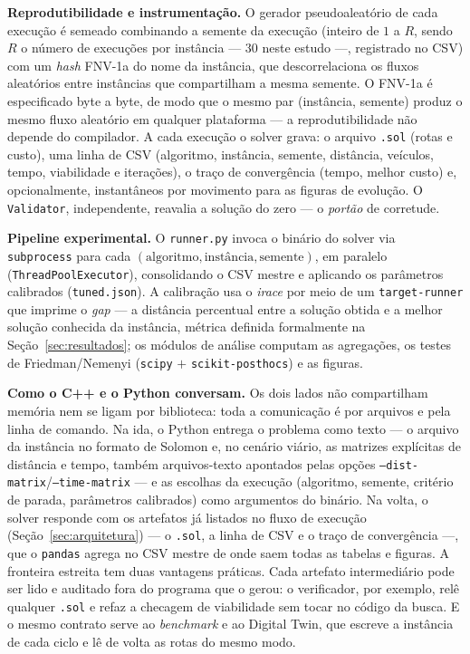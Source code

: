 \documentclass[12pt, a4paper]{article}
\begin{document}
\textbf{Reprodutibilidade e instrumentação.} O gerador pseudoaleatório de cada execução é semeado combinando a semente da execução (inteiro de $1$ a $R$, sendo $R$ o número de execuções por instância --- $30$ neste estudo ---, registrado no CSV) com um \emph{hash} FNV-1a do nome da instância, que descorrelaciona os fluxos aleatórios entre instâncias que compartilham a mesma semente. O FNV-1a é especificado byte a byte, de modo que o mesmo par (instância, semente) produz o mesmo fluxo aleatório em qualquer plataforma --- a reprodutibilidade não depende do compilador. A cada execução o solver grava: o arquivo \texttt{.sol} (rotas e custo), uma linha de CSV (algoritmo, instância, semente, distância, veículos, tempo, viabilidade e iterações), o traço de convergência (tempo, melhor custo) e, opcionalmente, instantâneos por movimento para as figuras de evolução. O \texttt{Validator}, independente, reavalia a solução do zero --- o \emph{portão} de corretude.

\textbf{Pipeline experimental.} O \texttt{runner.py} invoca o binário do solver via \texttt{subprocess} para cada $(\text{algoritmo},\text{instância},\text{semente})$, em paralelo (\texttt{ThreadPoolExecutor}), consolidando o CSV mestre e aplicando os parâmetros calibrados (\texttt{tuned.json}). A calibração usa o \textit{irace} por meio de um \texttt{target-runner} que imprime o \emph{gap} --- a distância percentual entre a solução obtida e a melhor solução conhecida da instância, métrica definida formalmente na Seção~\ref{sec:resultados}; os módulos de análise computam as agregações, os testes de Friedman/Nemenyi (\texttt{scipy} $+$ \texttt{scikit-posthocs}) e as figuras.

\textbf{Como o C++ e o Python conversam.} Os dois lados não compartilham memória nem se ligam por biblioteca: toda a comunicação é por arquivos e pela linha de comando. Na ida, o Python entrega o problema como texto --- o arquivo da instância no formato de Solomon e, no cenário viário, as matrizes explícitas de distância e tempo, também arquivos-texto apontados pelas opções \texttt{--dist-matrix}/\texttt{--time-matrix} --- e as escolhas da execução (algoritmo, semente, critério de parada, parâmetros calibrados) como argumentos do binário. Na volta, o solver responde com os artefatos já listados no fluxo de execução (Seção~\ref{sec:arquitetura}) --- o \texttt{.sol}, a linha de CSV e o traço de convergência ---, que o \texttt{pandas} agrega no CSV mestre de onde saem todas as tabelas e figuras. A fronteira estreita tem duas vantagens práticas. Cada artefato intermediário pode ser lido e auditado fora do programa que o gerou: o verificador, por exemplo, relê qualquer \texttt{.sol} e refaz a checagem de viabilidade sem tocar no código da busca. E o mesmo contrato serve ao \textit{benchmark} e ao Digital Twin, que escreve a instância de cada ciclo e lê de volta as rotas do mesmo modo.
\end{document}
